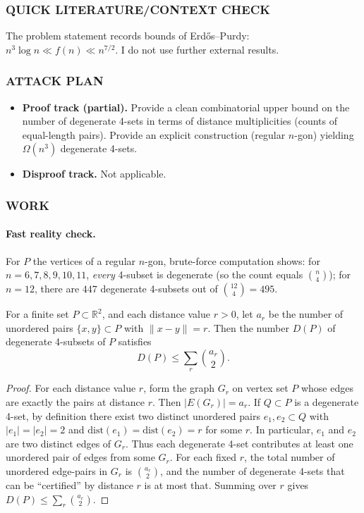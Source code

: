 \subsubsection*{QUICK LITERATURE/CONTEXT CHECK}
The problem statement records bounds of Erd\H{o}s--Purdy:
\(n^3\log n \ll f(n) \ll n^{7/2}\).
I do not use further external results.

\subsubsection*{ATTACK PLAN}
\begin{itemize}
\item \textbf{Proof track (partial).} Provide a clean combinatorial upper bound on the number of degenerate 4-sets in terms of distance multiplicities (counts of equal-length pairs). Provide an explicit construction (regular \(n\)-gon) yielding \(\Omega(n^3)\) degenerate 4-sets.
\item \textbf{Disproof track.} Not applicable.
\end{itemize}

\subsubsection*{WORK}

\paragraph{Fast reality check.} For \(P\) the vertices of a regular \(n\)-gon, brute-force computation shows:
for \(n=6,7,8,9,10,11\), \emph{every} 4-subset is degenerate (so the count equals \(\binom{n}{4}\)); for \(n=12\), there are \(447\) degenerate 4-subsets out of \(\binom{12}{4}=495\).

\begin{lemma}
For a finite set \(P\subset\mathbb{R}^2\), and each distance value \(r>0\), let
\(a_r\) be the number of unordered pairs \(\{x,y\}\subset P\) with \(\|x-y\|=r\).
Then the number \(D(P)\) of degenerate 4-subsets of \(P\) satisfies
\[
 D(P)\le \sum_{r} \binom{a_r}{2}.
\]
\end{lemma}

\begin{proof}
For each distance value \(r\), form the graph \(G_r\) on vertex set \(P\) whose edges are exactly the pairs at distance \(r\). Then \(|E(G_r)|=a_r\).
If \(Q\subset P\) is a degenerate 4-set, by definition there exist two distinct unordered pairs
\(e_1,e_2\subset Q\) with \(|e_1|=|e_2|=2\) and \(\mathrm{dist}(e_1)=\mathrm{dist}(e_2)=r\) for some \(r\).
In particular, \(e_1\) and \(e_2\) are two distinct edges of \(G_r\).
Thus each degenerate 4-set contributes at least one unordered pair of edges from some \(G_r\).
For each fixed \(r\), the total number of unordered edge-pairs in \(G_r\) is \(\binom{a_r}{2}\), and the number of degenerate 4-sets that can be ``certified'' by distance \(r\) is at most that.
Summing over \(r\) gives
\(D(P)\le \sum_r \binom{a_r}{2}\).
\end{proof}

